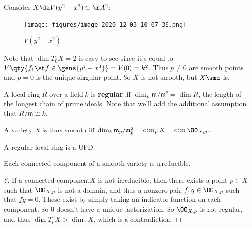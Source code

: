 \begin{example}[?]

Consider \(X\da V(y^2 - x^3) \subset \AA^2\):

\begin{figure}
\centering
\texttt{[image: figures/image\_2020-12-03-10-07-39.png]}
\caption{\(V(y^2 - x^2)\)}
\end{figure}

Note that \(\dim T_0 X = 2\) is easy to see since it's equal to
\(V\qty{f_1 \st f\in \gens{y^2 - x^3}} = V(0) = k^2\). Thus \(p\neq 0\)
are smooth points and \(p=0\) is the unique singular point. So \(X\) is
not smooth, but \(X\smz\) is.

\end{example}

\begin{definition}

A local ring \(R\) over a field \(k\) is \textbf{regular} iff
\(\dim_k \mathfrak{m}/\mathfrak{m}^2 = \dim R\), the length of the
longest chain of prime ideals. Note that we'll add the additional
assumption that \(R/\mathfrak{m} \cong k\).

\end{definition}

\begin{remark}

A variety \(X\) is thus smooth iff
\(\dim_k \mathfrak{m}_p / \mathfrak{m}_p^2 = \dim_p X = \dim \OO_{X, p}\).

\end{remark}

\begin{theorem}

A regular local ring is a UFD.

\end{theorem}

\begin{corollary}[?]

Each connected component of a smooth variety is irreducible.

\end{corollary}

\begin{proof}[?]

If a connected component\(X\) is not irreducible, then there exists a
point \(p\in X\) such that \(\OO_{X, p}\) is not a domain, and thus a
nonzero pair \(f, g \in \OO_{X, p}\) such that \(fg=0\). These exist by
simply taking an indicator function on each component. So \(0\) doesn't
have a unique factorization. So \(\OO_{X, p}\) is not regular, and thus
\(\dim T_p X > \dim_p X\), which is a contradiction.

\end{proof}

